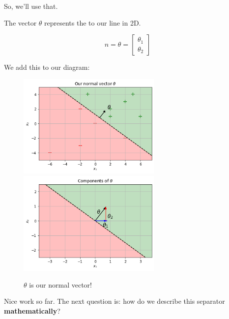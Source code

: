         So, we'll use that.\\
        
        \begin{notation}
            The vector $\theta$ represents the  to our line in 2D.
            
            \begin{equation*}
                \hat{n} = \theta =
                \begin{bmatrix}
                        \theta_1 \\
                        \theta_2
                \end{bmatrix}
            \end{equation*}
        \end{notation}
        
        We add this to our diagram:
        
        \begin{figure}[H]
                \includegraphics[width=70mm,scale=0.5]{images/classification_images/normal_vector_theta.png}
                \includegraphics[width=70mm,scale=0.5]{images/classification_images/theta_components.png}
                
                \caption*{$\theta$ is our normal vector!}
        \end{figure}
        
        Nice work so far. The next question is: how do we describe this separator \textbf{mathematically}?
        
